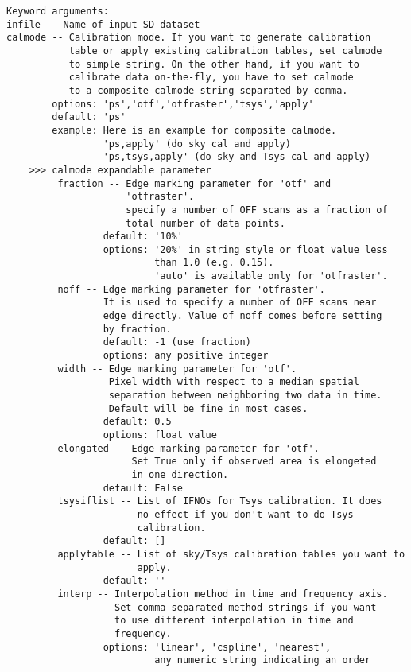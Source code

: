 \begin{verbatim}
Keyword arguments:
infile -- Name of input SD dataset
calmode -- Calibration mode. If you want to generate calibration 
           table or apply existing calibration tables, set calmode 
           to simple string. On the other hand, if you want to 
           calibrate data on-the-fly, you have to set calmode 
           to a composite calmode string separated by comma.
        options: 'ps','otf','otfraster','tsys','apply'
        default: 'ps'
        example: Here is an example for composite calmode.
                 'ps,apply' (do sky cal and apply)
                 'ps,tsys,apply' (do sky and Tsys cal and apply)
    >>> calmode expandable parameter
         fraction -- Edge marking parameter for 'otf' and 
                     'otfraster'.
                     specify a number of OFF scans as a fraction of 
                     total number of data points. 
                 default: '10%'
                 options: '20%' in string style or float value less 
                          than 1.0 (e.g. 0.15).
                          'auto' is available only for 'otfraster'. 
         noff -- Edge marking parameter for 'otfraster'.
                 It is used to specify a number of OFF scans near 
                 edge directly. Value of noff comes before setting 
                 by fraction.
                 default: -1 (use fraction)
                 options: any positive integer
         width -- Edge marking parameter for 'otf'.
                  Pixel width with respect to a median spatial 
                  separation between neighboring two data in time.
                  Default will be fine in most cases.
                 default: 0.5
                 options: float value
         elongated -- Edge marking parameter for 'otf'.
                      Set True only if observed area is elongeted 
                      in one direction.
                 default: False
         tsysiflist -- List of IFNOs for Tsys calibration. It does 
                       no effect if you don't want to do Tsys 
                       calibration.
                 default: []
         applytable -- List of sky/Tsys calibration tables you want to 
                       apply.
                 default: ''
         interp -- Interpolation method in time and frequency axis. 
                   Set comma separated method strings if you want 
                   to use different interpolation in time and 
                   frequency. 
                 options: 'linear', 'cspline', 'nearest', 
                          any numeric string indicating an order 

\end{verbatim}

